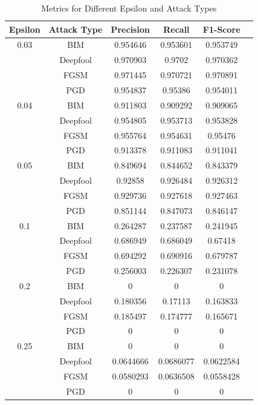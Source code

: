 \documentclass[10pt, conference, a4paper, final]{IEEEtran}
\begin{document}
    \begin{table}[htbp]
    \centering
    \caption{Metrics for Different Epsilon and Attack Types}
    \begin{tabular}{cccccc}
    \toprule
    Epsilon & Attack Type & Precision & Recall & F1-Score \\
    \midrule
    0.03 & BIM & 0.954646 & 0.953601 & 0.953749 \\
    \cmidrule(lr){2-5}
    & Deepfool & 0.970903 & 0.9702 & 0.970362 \\
    \cmidrule(lr){2-5}
    & FGSM & 0.971445 & 0.970721 & 0.970891 \\
    \cmidrule(lr){2-5}
    & PGD & 0.954837 & 0.95386 & 0.954011 \\
    \midrule
    0.04 & BIM & 0.911803 & 0.909292 & 0.909065 \\
    \cmidrule(lr){2-5}
    & Deepfool & 0.954805 & 0.953713 & 0.953828 \\
    \cmidrule(lr){2-5}
    & FGSM & 0.955764 & 0.954631 & 0.95476 \\
    \cmidrule(lr){2-5}
    & PGD & 0.913378 & 0.911083 & 0.911041 \\
    \midrule
    0.05 & BIM & 0.849694 & 0.844652 & 0.843379 \\
    \cmidrule(lr){2-5}
    & Deepfool & 0.92858 & 0.926484 & 0.926312 \\
    \cmidrule(lr){2-5}
    & FGSM & 0.929736 & 0.927618 & 0.927463 \\
    \cmidrule(lr){2-5}
    & PGD & 0.851144 & 0.847073 & 0.846147 \\
    \midrule
    0.1 & BIM & 0.264287 & 0.237587 & 0.241945 \\
    \cmidrule(lr){2-5}
    & Deepfool & 0.686949 & 0.686049 & 0.67418 \\
    \cmidrule(lr){2-5}
    & FGSM & 0.694292 & 0.690916 & 0.679787 \\
    \cmidrule(lr){2-5}
    & PGD & 0.256003 & 0.226307 & 0.231078 \\
    \midrule
    0.2 & BIM & 0 & 0 & 0 \\
    \cmidrule(lr){2-5}
    & Deepfool & 0.180356 & 0.17113 & 0.163833 \\
    \cmidrule(lr){2-5}
    & FGSM & 0.185497 & 0.174777 & 0.165671 \\
    \cmidrule(lr){2-5}
    & PGD & 0 & 0 & 0 \\
    \midrule
    0.25 & BIM & 0 & 0 & 0 \\
    \cmidrule(lr){2-5}
    & Deepfool & 0.0644666 & 0.0686077 & 0.0622584 \\
    \cmidrule(lr){2-5}
    & FGSM & 0.0580293 & 0.0636508 & 0.0558428 \\
    \cmidrule(lr){2-5}
    & PGD & 0 & 0 & 0 \\
    \bottomrule
    \end{tabular}
    \label{tab:metrics}
    \end{table}
    
\end{document}
